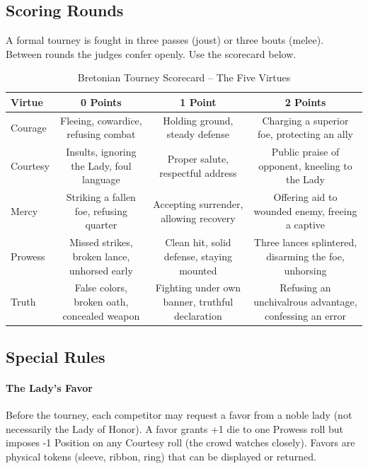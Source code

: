 \documentclass[11pt,twoside]{book}
\begin{document}
\subsection*{Scoring Rounds}
A formal tourney is fought in three passes (joust) or three bouts (melee). Between rounds the judges confer openly. Use the scorecard below.

\begin{table}[h]
\centering
\begin{tabular}{|l|c|c|c|}
\hline
\textbf{Virtue} & \textbf{0 Points} & \textbf{1 Point} & \textbf{2 Points} \\
\hline
Courage & Fleeing, cowardice, refusing combat & Holding ground, steady defense & Charging a superior foe, protecting an ally \\
\hline
Courtesy & Insults, ignoring the Lady, foul language & Proper salute, respectful address & Public praise of opponent, kneeling to the Lady \\
\hline
Mercy & Striking a fallen foe, refusing quarter & Accepting surrender, allowing recovery & Offering aid to wounded enemy, freeing a captive \\
\hline
Prowess & Missed strikes, broken lance, unhorsed early & Clean hit, solid defense, staying mounted & Three lances splintered, disarming the foe, unhorsing \\
\hline
Truth & False colors, broken oath, concealed weapon & Fighting under own banner, truthful declaration & Refusing an unchivalrous advantage, confessing an error \\
\hline
\end{tabular}
\caption{Bretonian Tourney Scorecard -- The Five Virtues}
\end{table}

\subsection*{Special Rules}

\paragraph{The Lady's Favor}
Before the tourney, each competitor may request a favor from a noble lady (not necessarily the Lady of Honor). A favor grants +1 die to one Prowess roll but imposes -1 Position on any Courtesy roll (the crowd watches closely). Favors are physical tokens (sleeve, ribbon, ring) that can be displayed or returned.
\end{document}
